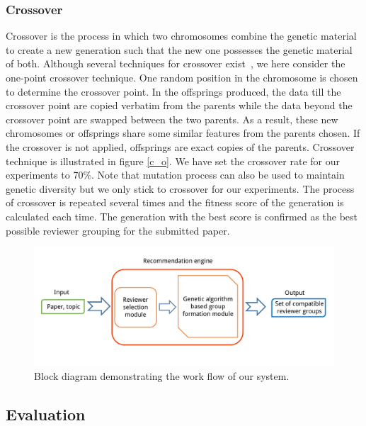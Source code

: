 \subsubsection{Crossover}
Crossover is the process in which two chromosomes combine the genetic material to create a new generation such that the new one possesses the genetic material of both. 
Although several techniques for crossover exist~\cite{golberg1989genetic}, we here consider the one-point crossover technique. 
One random position in the chromosome is chosen to determine the crossover point. In the offsprings produced, the data till the crossover point are copied verbatim from the parents while the data beyond the crossover point are swapped between the two parents. As a result, these new chromosomes or
offsprings share some similar features from the parents chosen. If the crossover is not applied, offsprings are exact copies
of the parents. Crossover technique is illustrated in figure \ref{c_o}.
We have set the crossover rate for our experiments to 70\%. 
Note that mutation process can also be used to maintain genetic diversity but we only stick to crossover for our experiments. 
The process of crossover is repeated several times and the fitness score of the generation is calculated each time. The generation 
with the best score is confirmed as the best possible reviewer grouping for the submitted paper.

\begin{figure}
\centering
\includegraphics[scale=0.32]{./texfiles/Chapter_4/cikm_17/figures/r_d_g.pdf}
\caption{\label{r_d_g} Block diagram demonstrating the work flow of our system.}
\vspace{4mm}
\end{figure}

\subsection{Evaluation}

